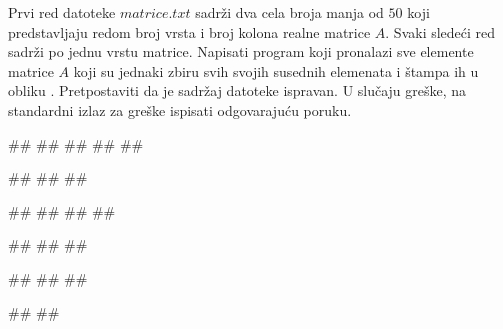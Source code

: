 \begin{Exercise}[label=p3_iv4]         
Prvi red datoteke $matrice.txt$ sadrži dva cela broja manja od
$50$ koji predstavljaju redom broj vrsta i broj kolona realne matrice
$A$. Svaki sledeći red sadrži po jednu vrstu matrice. Napisati
program koji pronalazi sve elemente matrice $A$ koji su jednaki zbiru
svih svojih susednih elemenata i štampa ih u obliku
. 
Pretpostaviti da je sadržaj datoteke ispravan.
U slučaju greške, na standardni izlaz za greške ispisati odgovarajuću poruku.

\begin{minitest}
\begin{upotreba}{1}
##
##
##
##
##

#\naslovIzlaz#
##
##
\end{upotreba}
\end{minitest}
\begin{minitest}
\begin{upotreba}{2}
##
##
##
##

#\naslovIzlaz#
##
##
\end{upotreba}
\end{minitest}
\begin{minitest}
\begin{upotreba}{3}
##
##
##

#\naslovIzlaz#
##
\end{upotreba}
\end{minitest}
\end{Exercise}
\begin{Answer}[ref=p3_iv4]
\end{Answer}


